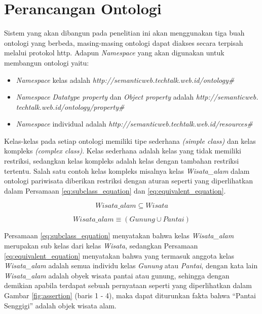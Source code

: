 \section{Perancangan Ontologi}
Sistem yang akan dibangun pada penelitian ini akan menggunakan tiga buah ontologi yang berbeda, masing-masing ontologi dapat diakses secara terpisah melalui protokol http. Adapun \emph{Namespace} yang akan digunakan untuk membangun ontologi yaitu:

\begin{itemize}
	\item \emph{Namespace} kelas adalah \emph{http://semanticweb.techtalk.web\-.id/ontology\#}
	\item \emph{Namespace} \emph{Datatype property} dan \emph{Object property} adalah \emph{http://semanticweb.\\techtalk.web.id/ontology/property\#}
	\item \emph{Namespace} individual adalah \emph{http://semanticweb.techtalk.web.id/resources\#}
\end{itemize}

Kelas-kelas pada setiap ontologi memiliki tipe sederhana \emph{(simple class)} dan kelas kompleks \emph{(complex class)}. Kelas sederhana adalah kelas yang tidak memiliki restriksi, sedangkan kelas kompleks adalah kelas dengan tambahan restriksi tertentu. Salah satu contoh kelas kompleks misalnya kelas \emph{Wisata\_alam} dalam ontologi pariwisata diberikan restriksi dengan aturan seperti yang diperlihatkan dalam Persamaan \ref{eq:subclass_equation} dan \ref{eq:equivalent_equation}.

\begin{equation}
	Wisata\_alam \subseteq Wisata
	\label{eq:subclass_equation}
\end{equation}

\begin{equation}
	Wisata\_alam \equiv (Gunung \cup Pantai)
	\label{eq:equivalent_equation}
\end{equation}

Persamaan \ref{eq:subclass_equation} menyatakan bahwa kelas \emph{Wisata\_alam} merupakan sub kelas dari kelas \emph{Wisata}, sedangkan Persamaan \ref{eq:equivalent_equation} menyatakan bahwa yang termasuk anggota kelas \emph{Wisata\_alam} adalah semua individu kelas \emph{Gunung} atau \emph{Pantai}, dengan kata lain \emph{Wisata\_alam} adalah obyek wisata pantai atau gunung, sehingga dengan demikian apabila terdapat sebuah pernyataan seperti yang diperlihatkan dalam Gambar \ref{fig:assertion} (baris 1 - 4), maka dapat diturunkan fakta bahwa ``Pantai Senggigi'' adalah objek wisata alam.

